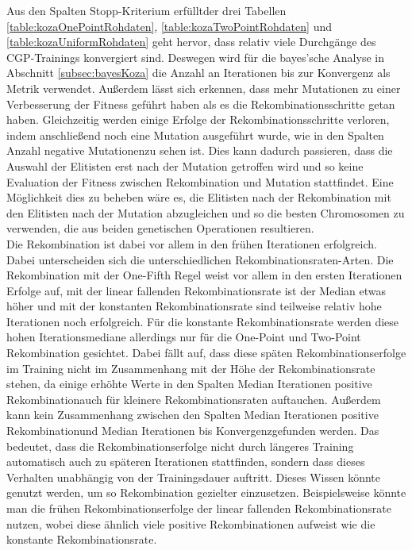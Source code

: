 Aus den Spalten \glqq Stopp-Kriterium erfüllt\grqq\space der drei Tabellen \ref{table:kozaOnePointRohdaten}, \ref{table:kozaTwoPointRohdaten} und \ref{table:kozaUniformRohdaten} geht hervor, dass relativ viele Durchgänge des CGP-Trainings konvergiert sind.
Deswegen wird für die bayes'sche Analyse in Abschnitt \ref{subsec:bayesKoza} die Anzahl an Iterationen bis zur Konvergenz als Metrik verwendet.
Außerdem lässt sich erkennen, dass mehr Mutationen zu einer Verbesserung der Fitness geführt haben als es die Rekombinationsschritte getan haben.
Gleichzeitig werden einige Erfolge der Rekombinationsschritte verloren, indem anschließend noch eine Mutation ausgeführt wurde, wie in den Spalten \glqq Anzahl negative Mutationen\grqq\space zu sehen ist.
Dies kann dadurch passieren, dass die Auswahl der Elitisten erst nach der Mutation getroffen wird und so keine Evaluation der Fitness zwischen Rekombination und Mutation stattfindet.
Eine Möglichkeit dies zu beheben wäre es, die Elitisten nach der Rekombination mit den Elitisten nach der Mutation abzugleichen und so die besten Chromosomen zu verwenden, die aus beiden genetischen Operationen resultieren.\\
Die Rekombination ist dabei vor allem in den frühen Iterationen erfolgreich.
Dabei unterscheiden sich die unterschiedlichen Rekombinationsraten-Arten.
Die Rekombination mit der One-Fifth Regel weist vor allem in den ersten Iterationen Erfolge auf, mit der linear fallenden Rekombinationsrate ist der Median etwas höher und mit der konstanten Rekombinationsrate sind teilweise relativ hohe Iterationen noch erfolgreich.
Für die konstante Rekombinationsrate werden diese hohen Iterationsmediane allerdings nur für die One-Point und Two-Point Rekombination gesichtet.
Dabei fällt auf, dass diese späten Rekombinationserfolge im Training nicht im Zusammenhang mit der Höhe der Rekombinationsrate stehen, da einige erhöhte Werte in den Spalten \glqq Median Iterationen positive Rekombination\grqq\space auch für kleinere Rekombinationsraten auftauchen.
Außerdem kann kein Zusammenhang zwischen den Spalten \glqq Median Iterationen positive Rekombination\grqq\space und \glqq Median Iterationen bis Konvergenz\grqq\space gefunden werden.
Das bedeutet, dass die Rekombinationserfolge nicht durch längeres Training automatisch auch zu späteren Iterationen stattfinden, sondern dass dieses Verhalten unabhängig von der Trainingsdauer auftritt.
Dieses Wissen könnte genutzt werden, um so Rekombination gezielter einzusetzen.
Beispielsweise könnte man die frühen Rekombinationserfolge der linear fallenden Rekombinationsrate nutzen, wobei diese ähnlich viele positive Rekombinationen aufweist wie die konstante Rekombinationsrate.
